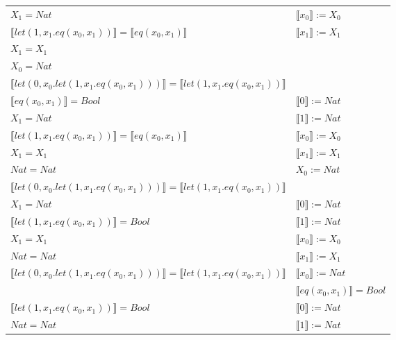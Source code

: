 \begin{exercise}
\begin{description}
\begin{center}
\begin{longtable}{ | l | l | }
                        $X_1 = Nat$ & $ \llbracket x_0 \rrbracket := X_0$  \\
                        $ \llbracket let(1,x_1.eq(x_0,x_1)) \rrbracket =  \llbracket eq(x_0,x_1) \rrbracket$  &  $ \llbracket x_1 \rrbracket := X_1$ \\
                        $X_1 = X_1$  & \\
                        $X_0 = Nat$ & \\
                        $ \llbracket let(0,x_0.let(1,x_1.eq(x_0,x_1))) \rrbracket =  \llbracket let(1,x_1.eq(x_0,x_1)) \rrbracket$ & \\
                      \hline
                        $ \llbracket eq(x_0,x_1) \rrbracket = Bool$  & $ \llbracket 0 \rrbracket := Nat$ \\
                        $X_1 = Nat$ & $ \llbracket 1 \rrbracket := Nat$ \\
                        $ \llbracket let(1,x_1.eq(x_0,x_1)) \rrbracket =  \llbracket eq(x_0,x_1) \rrbracket$  & $ \llbracket x_0 \rrbracket := X_0$ \\
                        $X_1 = X_1$  & $ \llbracket x_1 \rrbracket := X_1$ \\
                        $Nat = Nat$ & $X_0 := Nat$ \\
                        $ \llbracket let(0,x_0.let(1,x_1.eq(x_0,x_1))) \rrbracket =  \llbracket let(1,x_1.eq(x_0,x_1)) \rrbracket$ & \\
                      \hline
                        $X_1 = Nat$ & $ \llbracket 0 \rrbracket := Nat$  \\
                        $ \llbracket let(1,x_1.eq(x_0,x_1)) \rrbracket = Bool$  & $ \llbracket 1 \rrbracket := Nat$ \\
                        $X_1 = X_1$  & $ \llbracket x_0 \rrbracket := X_0$  \\
                        $Nat = Nat$ & $ \llbracket x_1 \rrbracket := X_1$ \\
                        $ \llbracket let(0,x_0.let(1,x_1.eq(x_0,x_1))) \rrbracket =  \llbracket let(1,x_1.eq(x_0,x_1)) \rrbracket$ &  $ \llbracket x_0 \rrbracket := Nat$ \\
                        & $ \llbracket eq(x_0,x_1) \rrbracket = Bool$ \\
                      \hline
                        $ \llbracket let(1,x_1.eq(x_0,x_1)) \rrbracket = Bool$  &  $ \llbracket 0 \rrbracket := Nat$  \\
                        $Nat = Nat$  &  $ \llbracket 1 \rrbracket := Nat$ \\

\end{longtable}
\end{center}
\end{description}
\end{exercise}
